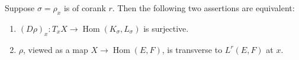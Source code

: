 Suppose $\sigma = \rho_x$ is of corank $r$. Then the following two assertions are equivalent:
\begin{enumerate}
\item[(a)] $(D\rho)_x : T_x X \to \operatorname{Hom}(K_\sigma, L_\sigma)$ is surjective.
\item[(b)] $\rho$, viewed as a map $X \to \operatorname{Hom}(E, F)$, is transverse to $L^r(E, F)$ at $x$.
\end{enumerate}

